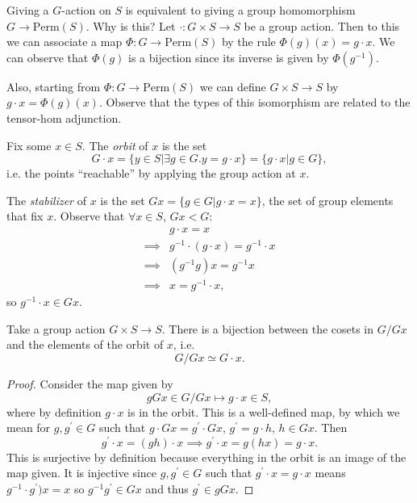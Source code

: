 \begin{remark}
Giving a $G$-action on $S$ is equivalent to giving a group
homomorphism $G \to \mathrm{Perm}(S)$. Why is this? Let
$\cdot : G \times S \to S$ be a group action. Then to this we can
associate a map $\Phi : G \to \mathrm{Perm}(S)$ by the rule
$\Phi(g)(x) = g \cdot x$. We can observe that $\Phi(g)$ is a bijection
since its inverse is given by $\Phi(g^{-1})$.

Also, starting from $\Phi : G \to \mathrm{Perm}(S)$ we can define
$G \times S \to S$ by $g \cdot x = \Phi(g)(x)$. Observe that the types
of this isomorphism are related to the tensor-hom adjunction.
\end{remark}

\begin{defn}
Fix some $x \in S$. The \emph{orbit} of $x$ is the set
$$
G \cdot x = \{ y \in S | \exists g \in G . y = g \cdot x \}
          = \{ g \cdot x | g \in G \},
$$
i.e. the points ``reachable'' by applying the group action at $x$.

The \emph{stabilizer} of $x$ is the set
$Gx = \{ g \in G | g \cdot x = x \}$, the set of group elements that
fix $x$.
Observe that
$\forall x \in S$, $Gx < G$:
\begin{align*}
         & g \cdot x = x \\
\implies & g^{-1} \cdot (g \cdot x) = g^{-1} \cdot x \\
\implies & (g^{-1} g) x = g^{-1} x \\
\implies & x = g^{-1} \cdot x,
\end{align*}
so $g^{-1} \cdot x \in Gx$.
\end{defn}

\begin{prop}
Take a group action $G \times S \to S$. There is a bijection between
the cosets in $G / Gx$ and the elements of the orbit of $x$, i.e.
$$
G / Gx \simeq G \cdot x.
$$
\end{prop}
\begin{proof}
Consider the map given by
$$
gGx \in G / Gx \mapsto g \cdot x \in S,
$$
where by definition $g \cdot x$ is in the orbit. This is a
well-defined map, by which we mean for $g, g^\prime \in G$ such that
$g \cdot Gx = g^\prime \cdot Gx$, $g^\prime = g \cdot h$, $h \in
Gx$. Then
$$
g^\prime \cdot x = (g h) \cdot x
\implies g^\prime \cdot x = g(hx) = g \cdot x.
$$
This is surjective by definition because everything in the orbit is an
image of the map given. It is injective since $g, g^\prime \in G$ such
that $g^\prime \cdot x = g \cdot x$ means $g^{-1} \cdot g^\prime) x =
x$ so $g^{-1} g^\prime \in G x$ and thus $g^\prime \in g G x$.
\end{proof}

